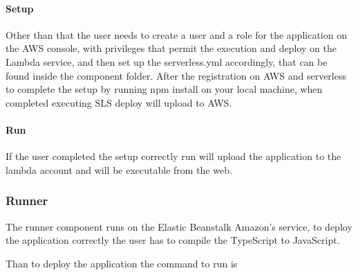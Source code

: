 \paragraph{Setup}
Other than that the user needs to create a user and a role for the application on the AWS console,
with privileges that permit the execution and deploy on the Lambda service, and then set up the serverless.yml accordingly,
that can be found inside the component folder.
After the registration on AWS and serverless to complete the setup by running npm install on your local machine, when completed executing SLS deploy will upload to AWS.
\paragraph{Run}
If the user completed the setup correctly run  will upload the application to the lambda account and will be executable from the web.
\subsubsection{Runner}
The runner component runs on the Elastic Beanstalk Amazon's service, to deploy the application correctly the user has to compile the TypeScript to JavaScript.
\begin{center}
\end{center}

Than to deploy the application the command to run is 